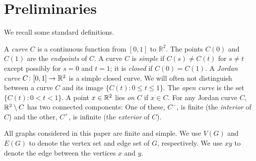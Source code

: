 \section{%
  Preliminaries}

We recall some %
standard definitions. %


%
A \emph{curve} $C$ is a continuous function from $[0,1]$
to $\mathbb{R}^2$.  The points $C(0)$ and $C(1)$ are the \emph{endpoints} of $C$.  A curve $C$ is \emph{simple} if $C(s)\neq C(t)$
for $s\ne t$ %
except possibly for $s=0$ and $t=1$; it is \emph{closed} if $C(0)=C(1)$.  A \emph{Jordan
	curve} $C\colon [0,1]\to\mathbb{R}^2$ is a simple closed curve.  
We will often not distinguish between a curve $C$ and its
image $\{C(t):0\le t\le 1\}$. %
The \emph{open curve} is the set $\{C(t):0< t< 1\}$.
%
A point $x\in\mathbb{R}^2$ lies \emph{on} $C$ if $x\in C$.  %
%
For any Jordan curve $C$, $\mathbb{R}^2\setminus C$ has two connected
components: One of these, $C^-$, is finite (the {\em interior} of $C$) and the other, $C^+$, is
infinite (the {\em exterior} of $C$).  
%


All graphs considered in this paper are finite and simple.   
We use $V(G)$ and $E(G)$ to denote the vertex set and edge
set of $G$, respectively.
We use $xy$
to denote the edge between the vertices %
$x$ and $y$. %

